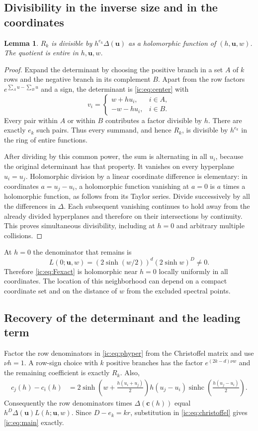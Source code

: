 \documentclass[11pt,a4paper]{article}
\numberwithin{equation}{section}
\newtheorem{lemma}[theorem]{Lemma}
\theoremstyle{definition}
\theoremstyle{remark}
\newcommand{\Del}{\Delta}
\newcommand{\bu}{\boldsymbol u}
\newcommand{\sinhc}{\operatorname{sinhc}}
\begin{document}
\subsection{Divisibility in the inverse size and in the coordinates}
\begin{lemma}\label{ic:lem:divisibility}
$R_k$ is divisible by $h^{e_k}\Del(\bu)$ as a holomorphic function of
$(h,\bu,w)$. The quotient is entire in $h,\bu,w$.
\end{lemma}
\begin{proof}
Expand the determinant by choosing the positive branch in a set $A$ of
$k$ rows and the negative branch in its complement $B$. Apart from the
row factors $e^{\sum_Au-\sum_Bu}$ and a sign, the determinant is
\eqref{ic:eq:center} with
\[
 v_i=\begin{cases}w+hu_i,&i\in A,\\-w-hu_i,&i\in B.\end{cases}
\]
Every pair within $A$ or within $B$ contributes a factor divisible by
$h$. There are exactly $e_k$ such pairs. Thus every summand, and hence
$R_k$, is divisible by $h^{e_k}$ in the ring of entire functions.

After dividing by this common power, the sum is alternating in all
$u_i$, because the original determinant has that property. It vanishes
on every hyperplane $u_i=u_j$. Holomorphic division by a linear
coordinate difference is elementary: in coordinates $a=u_j-u_i$, a
holomorphic function vanishing at $a=0$ is $a$ times a holomorphic
function, as follows from its Taylor series. Divide successively by all
the differences in $\Del$. Each subsequent vanishing continues to hold
away from the already divided hyperplanes and therefore on their
intersections by continuity. This proves simultaneous divisibility,
including at $h=0$ and arbitrary multiple collisions.
\end{proof}

At $h=0$ the denominator that remains is
\begin{equation}\label{ic:eq:Lzero}
 L(0;\bu,w)=(2\sinh(w/2))^d(2\sinh w)^D\ne0.
\end{equation}
Therefore \eqref{ic:eq:Fexact} is holomorphic near $h=0$ locally uniformly in
all coordinates. The location of this neighborhood can depend on a
compact coordinate set and on the distance of $w$ from the excluded
spectral points.

\subsection{Recovery of the determinant and the leading term}
Factor the row denominators in \eqref{ic:eq:phyper} from the Christoffel
matrix and use $\nu h=1$. A row-sign choice with $k$ positive branches
has the factor $e^{(2k-d)\nu w}$ and the remaining coefficient is exactly
$R_k$. Also,
\begin{align}\label{ic:eq:crootdiff}
 c_j(h)-c_i(h)
 &=2\sinh\left(w+\frac{h(u_i+u_j)}2\right)
   h(u_j-u_i)\sinhc\left(\frac{h(u_j-u_i)}2\right).
\end{align}
Consequently the row denominators times $\Del(\boldsymbol c(h))$ equal
$h^D\Del(\bu)L(h;\bu,w)$. Since $D-e_k=kr$, substitution in
\eqref{ic:eq:christoffel} gives \eqref{ic:eq:main} exactly.
\end{document}
